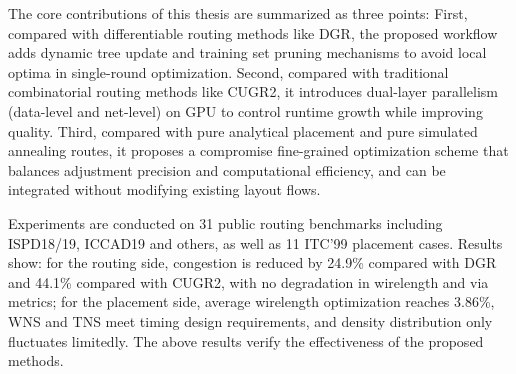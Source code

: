 \begin{abstract*}
  The core contributions of this thesis are summarized as three points: First, compared with differentiable routing methods like DGR, the proposed workflow adds dynamic tree update and training set pruning mechanisms to avoid local optima in single-round optimization. Second, compared with traditional combinatorial routing methods like CUGR2, it introduces dual-layer parallelism (data-level and net-level) on GPU to control runtime growth while improving quality. Third, compared with pure analytical placement and pure simulated annealing routes, it proposes a compromise fine-grained optimization scheme that balances adjustment precision and computational efficiency, and can be integrated without modifying existing layout flows.

  Experiments are conducted on 31 public routing benchmarks including ISPD18/19, ICCAD19 and others, as well as 11 ITC'99 placement cases. Results show: for the routing side, congestion is reduced by 24.9\% compared with DGR and 44.1\% compared with CUGR2, with no degradation in wirelength and via metrics; for the placement side, average wirelength optimization reaches 3.86\%, WNS and TNS meet timing design requirements, and density distribution only fluctuates limitedly. The above results verify the effectiveness of the proposed methods.
\end{abstract*}

